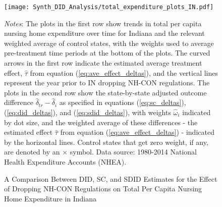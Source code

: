 \documentclass[../Main.tex]{subfiles}
\begin{document}
\newpage
\begin{figure}[t] 
	\begin{center}
	\caption{\label{fig:tot_exp_plots_in} \centering A Comparison Between DID, SC, and SDID Estimates for the Effect of Dropping NH-CON Regulations on Total Per Capita Nursing Home Expenditure in Indiana}
    \texttt{[image: Synth\_DID\_Analysis/total\_expenditure\_plots\_IN.pdf]}
    \end{center}
    \footnotesize
		\textit{Notes}: The plots in the first row show trends in total per capita nursing home expenditure over time for Indiana and the relevant weighted average of control states, with the weights used to average pre-treatment time periods at the bottom of the plots. The curved arrows in the first row indicate the estimated average treatment effect, $\hat{\tau}$ from equation (\ref{eq:ave_effect_deltas}), and the vertical lines represent the year prior to IN dropping NH-CON regulations. The plots in the second row show the state-by-state adjusted outcome difference $\hat{\delta}_{tr}-\hat{\delta}_i$ as specified in equations (\ref{eq:sc_deltas}), (\ref{eq:did_deltas}), and (\ref{eq:sdid_deltas}), with weights $\hat{\omega}_i$ indicated by dot size, and the weighted average of these differences - the estimated effect $\hat{\tau}$ from equation (\ref{eq:ave_effect_deltas}) - indicated by the horizontal lines. Control states that get zero weight, if any, are denoted by an $\times$ symbol. Data source: 1980-2014 National Health Expenditure Accounts (NHEA).
\end{figure}
\clearpage
\end{document}
